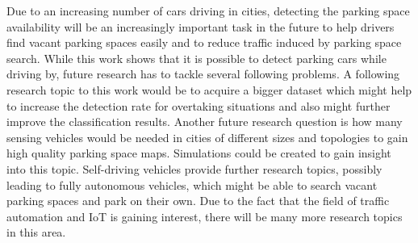 Due to an increasing number of cars driving in cities, detecting the parking space availability will be an increasingly important task in the future to help drivers find vacant parking spaces easily and to reduce traffic induced by parking space search. While this work shows that it is possible to detect parking cars while driving by, future research has to tackle several following problems. A following research topic to this work would be to acquire a bigger dataset which might help to increase the detection rate for overtaking situations and also might further improve the classification results. Another future research question is how many sensing vehicles would be needed in cities of different sizes and topologies to gain high quality parking space maps. Simulations could be created to gain insight into this topic. Self-driving vehicles provide further research topics, possibly leading to fully autonomous vehicles, which might be able to search vacant parking spaces and park on their own.  Due to the fact that the field of traffic automation and IoT is gaining interest, there will be many more research topics in this area.









